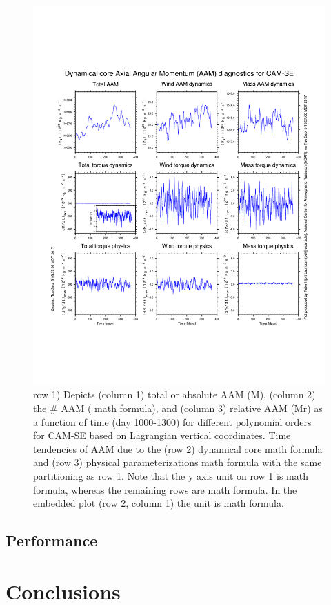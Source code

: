 \documentclass{agujournal}
\begin{document}


\begin{figure}[h]
\centering
\includegraphics[width=35pc]{figs/aam.pdf}
\caption{row 1) Depicts (column 1) total or absolute AAM (M), (column 2) the # AAM ( math formula), and (column 3) relative AAM (Mr) as a function of time (day 1000-1300) for different polynomial orders for CAM-SE based on Lagrangian vertical coordinates. Time tendencies of AAM due to the (row 2) dynamical core  math formula and (row 3) physical parameterizations  math formula with the same partitioning as row 1. Note that the y axis unit on row 1 is  math formula, whereas the remaining rows are  math formula. In the embedded plot (row 2, column 1) the unit is math formula.}
\label{fig:aam}
\end{figure}
\subsection{Performance}\label{sec:performance}

\section{Conclusions}\label{sec:concl}
\end{document}
